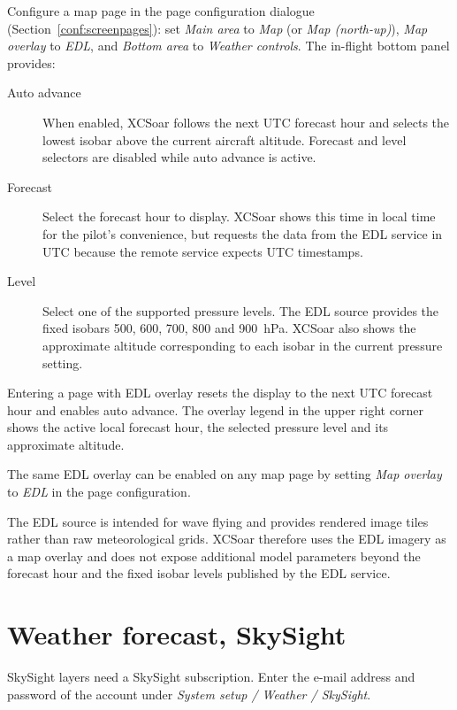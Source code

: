 Configure a map page in the page configuration dialogue
(Section~\ref{conf:screenpages}): set \emph{Main area} to \emph{Map}
(or \emph{Map (north-up)}), \emph{Map overlay} to \emph{EDL}, and
\emph{Bottom area} to \emph{Weather controls}.  The in-flight bottom
panel provides:
\begin{description}
\item[Auto advance] When enabled, XCSoar follows the next UTC forecast
  hour and selects the lowest isobar above the current aircraft
  altitude.  Forecast and level selectors are disabled while auto advance
  is active.
\item[Forecast] Select the forecast hour to display.  XCSoar shows this
  time in local time for the pilot's convenience, but requests the data
  from the EDL service in UTC because the remote service expects UTC
  timestamps.
\item[Level] Select one of the supported pressure levels.  The EDL
  source provides the fixed isobars 500, 600, 700, 800 and 900~hPa.
  XCSoar also shows the approximate altitude corresponding to each
  isobar in the current pressure setting.
\end{description}

Entering a page with EDL overlay resets the display to the next UTC
forecast hour and enables auto advance.  The overlay legend in the upper
right corner shows the active local forecast hour, the selected pressure
level and its approximate altitude.

The same EDL overlay can be enabled on any map page by setting
\emph{Map overlay} to \emph{EDL} in the page configuration.

The EDL source is intended for wave flying and provides rendered image
tiles rather than raw meteorological grids.  XCSoar therefore uses the
EDL imagery as a map overlay and does not expose additional model
parameters beyond the forecast hour and the fixed isobar levels
published by the EDL service.

\section{Weather forecast, SkySight}\label{sec:skysight}

SkySight layers need a SkySight subscription.  Enter the e-mail
address and password of the account under \emph{System setup /
Weather / SkySight}.

